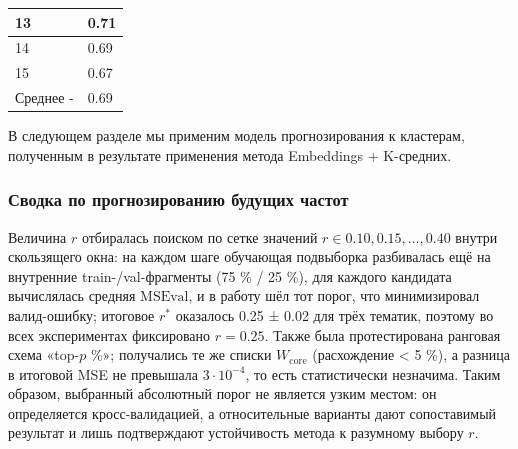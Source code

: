 \documentclass[14pt,a4paper]{article}
\begin{document}
\begin{table}[H]
\begin{tabular}{|l|l|}
13                                                                                     & 0.71                                    \\ \hline
14                                                                                     & 0.69                                    \\ \hline
15                                                                                      & 0.67                                    \\ \hline
Среднее                                      -                                            & 0.69                                    \\ \hline
\end{tabular}
\label{tab:LDAClusters}
\end{table}
В следующем разделе мы применим модель прогнозирования к кластерам, полученным в результате применения метода Embeddings + K-средних.



\subsubsection{Сводка по прогнозированию будущих частот}
\begin{table}[H]
\vspace{-1em}
\captionsetup{justification=raggedright, singlelinecheck=false}
\caption{Сравнение по кластерам ($\times 10^{-3}$ MSE $\pm$ SE)}
\label{tab:MSEComparison}

\end{table}
Величина $r$ отбиралась поиском по сетке значений $r\in{0.10,0.15,\dots,0.40}$ внутри скользящего окна: на каждом шаге обучающая подвыборка разбивалась ещё на внутренние train-/val-фрагменты (75 \% / 25 \%), для каждого кандидата вычислялась средняя $\text{MSE}{\text{val}}$, и в работу шёл тот порог, что минимизировал валид-ошибку; итоговое $r^\ast$ оказалось 0.25 ± 0.02 для трёх тематик, поэтому во всех экспериментах фиксировано $r=0.25$. Также была протестирована ранговая схема «top-$p$ \%»; получались те же списки $W_{\text{core}}$ (расхождение < 5 \%), а разница в итоговой MSE не превышала $3\cdot10^{-4}$, то есть статистически незначима. Таким образом, выбранный абсолютный порог не является узким местом: он определяется кросс-валидацией, а относительные варианты дают сопоставимый результат и лишь подтверждают устойчивость метода к разумному выбору $r$.
\end{document}
